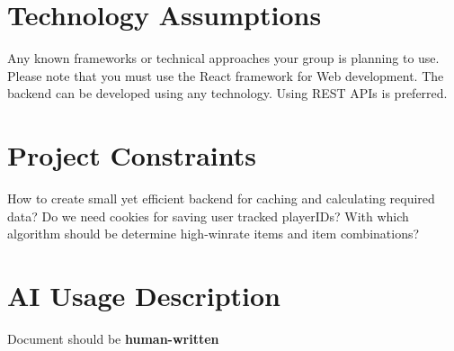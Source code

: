 \documentclass{article}
\begin{document}
\section{Technology Assumptions}
Any known frameworks or technical approaches your group
is planning to use. Please note that you must use the React framework for Web development. The backend can be developed using any technology. Using REST APIs is
preferred.

\section{Project Constraints}
How to create small yet efficient backend for caching and calculating required data? 
Do we need cookies for saving user tracked playerIDs?
With which algorithm should be determine high-winrate items and item combinations?

\section{AI Usage Description}
Document should be \textbf{human-written}
\end{document}
